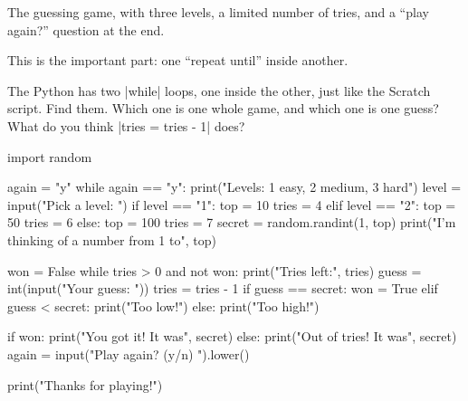 
The guessing game, with three levels, a limited number of tries, and a ``play again?'' question at the end.

This is the important part: one ``repeat until'' inside another.

\begin{center}
\begin{scratch}
\end{scratch}
\end{center}

\begin{think}
The Python has two \py|while| loops, one inside the other, just like the Scratch script. Find them. Which one is one whole game, and which one is one guess? What do you think \py|tries = tries - 1| does?
\end{think}

\begin{typethis}
import random

again = "y"
while again == "y":
    print("Levels: 1 easy, 2 medium, 3 hard")
    level = input("Pick a level: ")
    if level == "1":
        top = 10
        tries = 4
    elif level == "2":
        top = 50
        tries = 6
    else:
        top = 100
        tries = 7
    secret = random.randint(1, top)
    print("I'm thinking of a number from 1 to", top)

    won = False
    while tries > 0 and not won:
        print("Tries left:", tries)
        guess = int(input("Your guess: "))
        tries = tries - 1
        if guess == secret:
            won = True
        elif guess < secret:
            print("Too low!")
        else:
            print("Too high!")

    if won:
        print("You got it! It was", secret)
    else:
        print("Out of tries! It was", secret)
    again = input("Play again? (y/n) ").lower()

print("Thanks for playing!")
\end{typethis}

